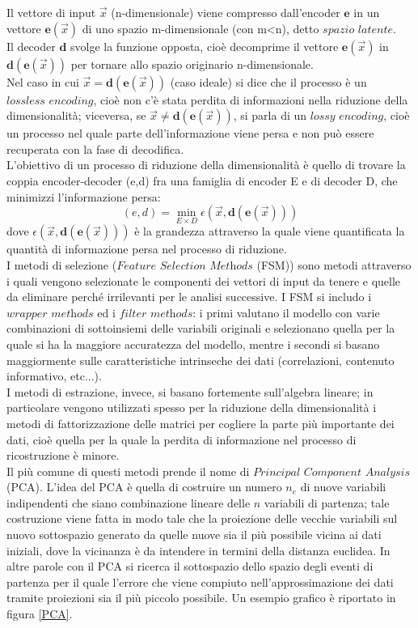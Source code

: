 Il vettore di input $\vec{x}$ (n-dimensionale) viene compresso dall'encoder $\textbf{e}$ in un vettore $\textbf{e}(\vec{x})$ di uno spazio m-dimensionale (con m<n), detto $\textit{spazio latente}$. \\
Il decoder $\textbf{d}$ svolge la funzione opposta, cioè decomprime il vettore $\textbf{e}(\vec{x})$ in $\textbf{d}(\textbf{e}(\vec{x}))$ per tornare allo spazio originario n-dimensionale. \\
Nel caso in cui $\vec{x} = \textbf{d}(\textbf{e}(\vec{x}))$ (caso ideale) si dice che il processo è un $\textit{lossless encoding}$, cioè non c'è stata perdita di informazioni nella riduzione della dimensionalità; viceversa, se $\vec{x} \not= \textbf{d}(\textbf{e}(\vec{x}))$, si parla di un $\textit{lossy encoding}$, cioè un processo nel quale parte dell'informazione viene persa e non può essere recuperata con la fase di decodifica. \\
L'obiettivo di un processo di riduzione della dimensionalità è quello di trovare la coppia encoder-decoder (e,d) fra una famiglia di encoder E e di decoder D, che minimizzi l'informazione persa:
\begin{equation}
(e,d) = \min_{E \times D} \epsilon (\vec{x},\textbf{d}(\textbf{e}(\vec{x})))
\end{equation}
dove $\epsilon (\vec{x},\textbf{d}(\textbf{e}(\vec{x})))$ è la grandezza attraverso la quale viene  quantificata la quantità di informazione persa nel processo di riduzione. \\
I metodi di selezione ($\textit{Feature Selection Methods}$ (FSM)) sono metodi attraverso i quali vengono selezionate le componenti dei vettori di input da tenere e quelle da eliminare perché irrilevanti per le analisi successive. I FSM si includo i $\textit{wrapper methods}$ ed i $\textit{filter methods}$: i primi valutano il modello con varie combinazioni di sottoinsiemi delle variabili originali e selezionano quella per la quale si ha la maggiore accuratezza del modello, mentre i secondi si basano maggiormente sulle caratteristiche intrinseche dei dati (correlazioni, contenuto informativo, etc...). \\
I metodi di estrazione, invece, si basano fortemente sull'algebra lineare; in particolare vengono utilizzati spesso per la riduzione della dimensionalità i metodi di fattorizzazione delle matrici per cogliere la parte più importante dei dati, cioè quella per la quale la perdita di informazione nel processo di ricostruzione è minore. \\
Il più comune di questi metodi prende il nome di $\textit{Principal Component Analysis}$ (PCA). L'idea del PCA è quella di costruire un numero $\textit{n}_\textit{e}$ di nuove variabili indipendenti che siano combinazione lineare delle $\textit{n}$ variabili di partenza; tale costruzione viene fatta in modo tale che la proiezione delle vecchie variabili sul nuovo sottospazio generato da quelle nuove sia il più possibile vicina ai dati iniziali, dove la vicinanza è da intendere in termini della distanza euclidea. In altre parole con il PCA si ricerca il sottospazio dello spazio degli eventi di partenza per il quale l'errore che viene compiuto nell'approssimazione dei dati tramite proiezioni sia il più piccolo possibile. Un esempio grafico è riportato in figura \ref{PCA}.
